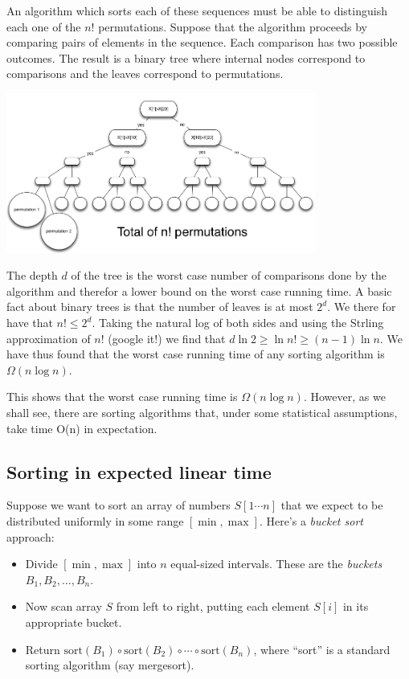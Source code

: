 An algorithm which sorts each of these sequences must be able to
distinguish each one of the $n!$ permutations. Suppose that the
algorithm proceeds by comparing pairs of elements in the
sequence. Each comparison has two possible outcomes. The result is a
binary tree where internal nodes correspond to comparisons and the
leaves correspond to permutations.

\begin{center}
\includegraphics[width=4in]{figs/SortingLowerBound.png}
\end{center}

The depth $d$ of the tree is the worst case number of comparisons done by
the algorithm and therefor a lower bound on the worst case running
time. A basic fact about binary trees is that the number of leaves is
at most $2^d$. We there for have that $n! \leq 2^d$. Taking the
natural log of both sides and using the Strling approximation of 
$n!$ (google it!) we
find that $d \ln 2 \geq \ln n! \geq (n-1) \ln n$. We have thus found that the
worst case running time of any sorting algorithm is $\Omega(n \log n)$.

This shows that the worst case running time is $\Omega(n \log
n)$. However, as we shall see, there are sorting algorithms that,
under some statistical assumptions, take time O(n) in expectation.

\subsection{Sorting in expected linear time}

Suppose we want to sort an array of numbers $S[1\cdots n]$ that we expect to be
distributed uniformly in some range $[\min,\max]$. Here's a {\it bucket sort} approach:
\begin{itemize}
\item Divide $[\min,\max]$ into $n$ equal-sized intervals. These are the {\it buckets} 
$B_1, B_2, \ldots, B_n$.
\item Now scan array $S$ from left to right, putting each element $S[i]$ in its
appropriate bucket.
\item Return $\mbox{sort}(B_1) \circ \mbox{sort}(B_2) \circ \cdots \circ \mbox{sort}(B_n)$,
where ``sort'' is a standard sorting algorithm (say mergesort).
\end{itemize}

